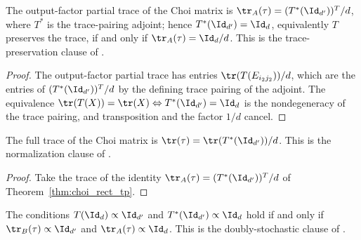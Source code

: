\begin{theorem}
    \label{thm:choi_rect_tp}
    \leanok
    The output-factor partial trace of the Choi matrix is
    $\tr_A(\tau)=(T^*(\Id_{d'}))^{T}/d$, where $T^*$ is the trace-pairing
    adjoint; hence $T^*(\Id_{d'})=\Id_d$, equivalently $T$ preserves the
    trace, if and only if $\tr_A(\tau)=\Id_d/d$. This is the
    trace-preservation clause of \cite[Proposition~2.1]{Wolf2012Quantum}.
\end{theorem}

\begin{proof}
    \leanok
    The output-factor partial trace has entries
    $\tr(T(E_{i_2 j_2}))/d$, which are the entries of
    $(T^*(\Id_{d'}))^{T}/d$ by the defining trace pairing of the adjoint.
    The equivalence $\tr(T(X))=\tr(X)\Leftrightarrow T^*(\Id_{d'})=\Id_d$
    is the nondegeneracy of the trace pairing, and transposition and the
    factor $1/d$ cancel.
\end{proof}

\begin{theorem}
    \label{thm:choi_rect_normalization}
    \leanok
    The full trace of the Choi matrix is
    $\tr(\tau)=\tr(T^*(\Id_{d'}))/d$. This is the normalization clause of
    \cite[Proposition~2.1]{Wolf2012Quantum}.
\end{theorem}

\begin{proof}
    \leanok
    Take the trace of the identity
    $\tr_A(\tau)=(T^*(\Id_{d'}))^{T}/d$ of Theorem~\ref{thm:choi_rect_tp}.
\end{proof}

\begin{theorem}
    \label{thm:choi_rect_doubly_stochastic}
    \leanok
    The conditions $T(\Id_d)\propto\Id_{d'}$ and
    $T^*(\Id_{d'})\propto\Id_d$ hold if and only if
    $\tr_B(\tau)\propto\Id_{d'}$ and $\tr_A(\tau)\propto\Id_d$. This is the
    doubly-stochastic clause of \cite[Proposition~2.1]{Wolf2012Quantum}.
\end{theorem}

